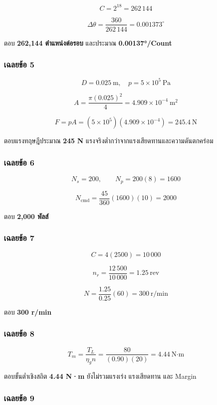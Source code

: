\[
C=2^{18}=262\,144
\]

\[
\Delta\theta=\frac{360}{262\,144}=0.001373^\circ
\]

ตอบ \textbf{262,144 ตำแหน่งต่อรอบ} และประมาณ \textbf{0.00137°/Count}

\subsubsection{เฉลยข้อ 5}

\[
D=0.025\ \text{m},\quad p=5\times10^5\ \text{Pa}
\]

\[
A=\frac{\pi(0.025)^2}{4}=4.909\times10^{-4}\ \text{m}^2
\]

\[
F=pA=(5\times10^5)(4.909\times10^{-4})=245.4\ \text{N}
\]

ตอบแรงทฤษฎีประมาณ \textbf{245 N} แรงจริงต่ำกว่าจากแรงเสียดทานและความดันตกคร่อม

\subsubsection{เฉลยข้อ 6}

\[
N_s=200,\qquad N_p=200(8)=1600
\]

\[
N_{\text{cmd}}
=
\frac{45}{360}(1600)(10)
=2000
\]

ตอบ \textbf{2,000 พัลส์}

\subsubsection{เฉลยข้อ 7}

\[
C=4(2500)=10\,000
\]

\[
n_r=\frac{12\,500}{10\,000}=1.25\ \text{rev}
\]

\[
N=\frac{1.25}{0.25}(60)=300\ \text{r/min}
\]

ตอบ \textbf{300 r/min}

\subsubsection{เฉลยข้อ 8}

\[
T_m=\frac{T_L}{\eta_g n}
=
\frac{80}{(0.90)(20)}
=4.44\ \text{N·m}
\]

ตอบขั้นต่ำเชิงสถิต \textbf{4.44 N·m} ยังไม่รวมแรงเร่ง แรงเสียดทาน และ Margin

\subsubsection{เฉลยข้อ 9}

